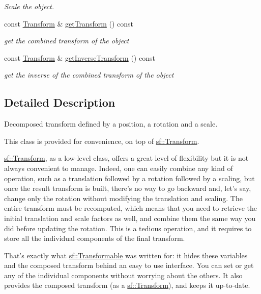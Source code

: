 \begin{DoxyCompactItemize}
\begin{DoxyCompactList}\small\item\em Scale the object. \end{DoxyCompactList}\item 
const \hyperlink{classsf_1_1_transform}{Transform} \& \hyperlink{classsf_1_1_transformable_a3b48c3362e3e2c14fef7551252deb7bb}{get\-Transform} () const 
\begin{DoxyCompactList}\small\item\em get the combined transform of the object \end{DoxyCompactList}\item 
const \hyperlink{classsf_1_1_transform}{Transform} \& \hyperlink{classsf_1_1_transformable_ab00de62b5d1efb2ee4cf2566dea98175}{get\-Inverse\-Transform} () const 
\begin{DoxyCompactList}\small\item\em get the inverse of the combined transform of the object \end{DoxyCompactList}\end{DoxyCompactItemize}


\subsection{Detailed Description}
Decomposed transform defined by a position, a rotation and a scale. 

This class is provided for convenience, on top of \hyperlink{classsf_1_1_transform}{sf\-::\-Transform}.

\hyperlink{classsf_1_1_transform}{sf\-::\-Transform}, as a low-\/level class, offers a great level of flexibility but it is not always convenient to manage. Indeed, one can easily combine any kind of operation, such as a translation followed by a rotation followed by a scaling, but once the result transform is built, there's no way to go backward and, let's say, change only the rotation without modifying the translation and scaling. The entire transform must be recomputed, which means that you need to retrieve the initial translation and scale factors as well, and combine them the same way you did before updating the rotation. This is a tedious operation, and it requires to store all the individual components of the final transform.

That's exactly what \hyperlink{classsf_1_1_transformable}{sf\-::\-Transformable} was written for\-: it hides these variables and the composed transform behind an easy to use interface. You can set or get any of the individual components without worrying about the others. It also provides the composed transform (as a \hyperlink{classsf_1_1_transform}{sf\-::\-Transform}), and keeps it up-\/to-\/date.

